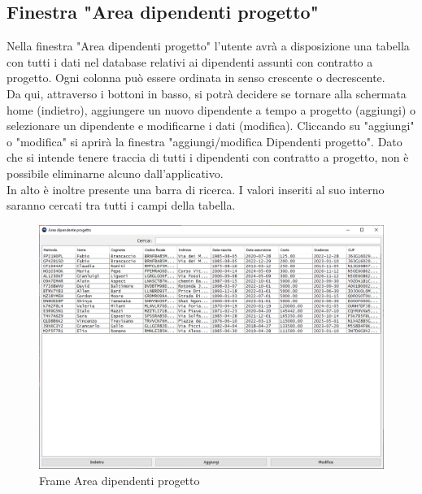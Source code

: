        \subsection {Finestra "Area dipendenti progetto"}
            Nella finestra "Area dipendenti progetto" l'utente avrà a disposizione una tabella con tutti i dati nel database relativi ai dipendenti assunti con contratto a progetto. Ogni colonna può essere ordinata in senso crescente o decrescente.\\
            Da qui, attraverso i bottoni in basso, si potrà decidere se tornare alla schermata home (indietro), aggiungere un nuovo dipendente a tempo a progetto (aggiungi) o selezionare un dipendente e modificarne i dati (modifica). Cliccando su "aggiungi" o "modifica" si aprirà la finestra "aggiungi/modifica Dipendenti progetto". Dato che si intende tenere traccia di tutti i dipendenti con contratto a progetto, non è possibile eliminarne alcuno dall'applicativo.\\
            In alto è inoltre presente una barra di ricerca. I valori inseriti al suo interno saranno cercati tra tutti i campi della tabella.
            \begin{figure}[htbp!]
                \centering
                    \vspace{2\baselineskip}
                    \includegraphics[width=0.9\linewidth]{Immagini/Frames/Frame Area/Frame Area dipendente progetto.png}
                \caption{Frame Area dipendenti progetto}
                \label{fig:Frame Area dipendenti progetto}
            \end{figure}

    \newpage

